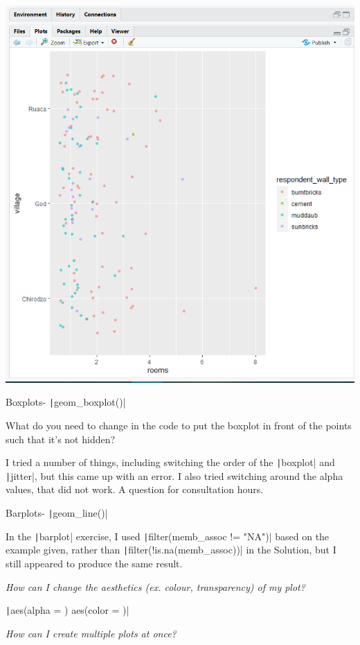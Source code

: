 \documentclass{article}
\begin{document}
\includegraphics[width=1.0\textwidth]{rstudio_26.PNG}

Boxplots- \texttt|geom_boxplot()|

{\item What do you need to change in the code to put the boxplot in front of the points such that it’s not hidden?
\item I tried a number of things, including switching the order of the \texttt|boxplot| and \texttt|jitter|, but this came up with an error. I also tried switching around the alpha values, that did not work. A question for consultation hours.}

Barplots- \texttt|geom_line()|

In the \texttt|barplot| exercise, I used \texttt|filter(memb_assoc != "NA")| based on the example given, rather than \texttt|filter(!is.na(memb_assoc))| in the Solution, but I still appeared to produce the same result.

\textit{How can I change the aesthetics (ex. colour, transparency) of my plot?}

\texttt|aes(alpha = ) aes(color = )|

\textit{How can I create multiple plots at once?}
\end{document}
